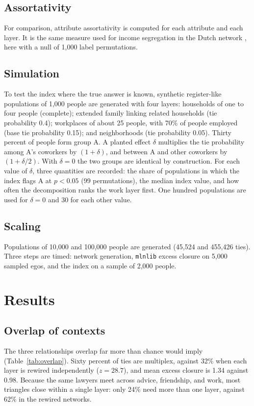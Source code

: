 \documentclass[11pt]{article}
\begin{document}
\subsection{Assortativity}
For comparison, attribute assortativity \citep{newman2003} is computed for each attribute and each layer. It is the same measure used for income segregation in the Dutch network \citep{kazmina2024}, here with a null of 1,000 label permutations.

\subsection{Simulation}
To test the index where the true answer is known, synthetic register-like populations of 1,000 people are generated with four layers: households of one to four people (complete); extended family linking related households (tie probability 0.4); workplaces of about 25 people, with 70\% of people employed (base tie probability 0.15); and neighborhoods (tie probability 0.05). Thirty percent of people form group A. A planted effect $\delta$ multiplies the tie probability among A's coworkers by $(1+\delta)$, and between A and other coworkers by $(1+\delta/2)$. With $\delta=0$ the two groups are identical by construction. For each value of $\delta$, three quantities are recorded: the share of populations in which the index flags A at $p<0.05$ (99 permutations), the median index value, and how often the decomposition ranks the work layer first. One hundred populations are used for $\delta=0$ and 30 for each other value.

\subsection{Scaling}
Populations of 10,000 and 100,000 people are generated (45,524 and 455,426 ties). Three steps are timed: network generation, \texttt{mlnlib} excess closure on 5,000 sampled egos, and the index on a sample of 2,000 people.

\section{Results}
\subsection{Overlap of contexts}
The three relationships overlap far more than chance would imply (Table~\ref{tab:overlap}). Sixty percent of ties are multiplex, against 32\% when each layer is rewired independently ($z=28.7$), and mean excess closure is 1.34 against 0.98. Because the same lawyers meet across advice, friendship, and work, most triangles close within a single layer: only 24\% need more than one layer, against 62\% in the rewired networks.
\end{document}
